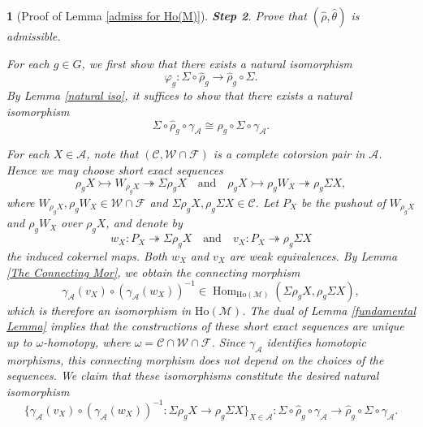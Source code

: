 \documentclass[12pt,twoside]{amsart}
\theoremstyle{bfupright head,slanted body}
\theoremstyle{bfupright head,upright body}
\newtheorem{bfhpg}[res]{}               \newtheorem*{bfhpg*}{}
\theoremstyle{fixed bf head,slanted body}
\theoremstyle{fixed bf head,upright body}
\theoremstyle{numbered paragraph}
\numberwithin{equation}{res}
\newcommand{\calC}{\mathcal{C}}
\newcommand{\calW}{\mathcal{W}}
\newcommand{\calF}{\mathcal{F}}
\newcommand{\calA}{\mathcal{A}}
\newcommand{\calM}{\mathcal{M}}
\newcommand{\Ho}{\mathrm{Ho}}
\newcommand{\Hom}{\operatorname{Hom}}
\begin{document}
\begin{bfhpg}[Proof of Lemma \ref{admiss for Ho(M)}]
\vspace{1ex}\textbf{Step 2}. Prove that $(\widehat{\rho}, \widehat{\theta})$ is admissible.

For each $g \in G$, we first show that there exists a natural isomorphism
\[
\varphi_g : \mathsf{\Sigma} \circ \widehat{\rho}_g \to \widehat{\rho}_g \circ \mathsf{\Sigma}.
\]
By Lemma \ref{natural iso}, it suffices to show that there exists a natural isomorphism
\[
\mathsf{\Sigma} \circ \widehat{\rho}_g \circ \gamma_{\calA} \cong \widehat{\rho}_g \circ \mathsf{\Sigma} \circ \gamma_{\calA}.
\]

For each $X \in \calA$, note that $(\calC, \calW \cap \calF)$ is a complete cotorsion pair in $\calA$.
Hence we may choose short exact sequences
\[
\rho_g X \rightarrowtail W_{\rho_g X} \twoheadrightarrow \mathsf{\Sigma} \rho_g X
\quad \text{and} \quad
\rho_g X \rightarrowtail \rho_g W_X \twoheadrightarrow \rho_g \mathsf{\Sigma} X,
\]
where $W_{\rho_g X}, \rho_g W_X \in \calW \cap \calF$ and $\mathsf{\Sigma} \rho_g X, \rho_g \mathsf{\Sigma} X \in \calC$.
Let $P_X$ be the pushout of $W_{\rho_g X}$ and $\rho_g W_X$ over $\rho_g X$, and denote by
\[
w_X : P_X \twoheadrightarrow \mathsf{\Sigma} \rho_g X
\quad \text{and} \quad
v_X : P_X \twoheadrightarrow \rho_g \mathsf{\Sigma} X
\]
the induced cokernel maps.
Both $w_X$ and $v_X$ are weak equivalences.
By Lemma \ref{The Connecting Mor}, we obtain the connecting morphism
\[
\gamma_{\calA}(v_X) \circ (\gamma_{\calA}(w_X))^{-1} \in \Hom_{\Ho(\calM)}(\mathsf{\Sigma} \rho_g X, \rho_g \mathsf{\Sigma} X),
\]
which is therefore an isomorphism in $\Ho(\calM)$.
The dual of Lemma \ref{fundamental Lemma} implies that the constructions of these short exact sequences are unique up to $\omega$-homotopy, where $\omega = \calC \cap \calW \cap \calF$.
Since $\gamma_{\calA}$ identifies homotopic morphisms, this connecting morphism does not depend on the choices of the sequences.
We claim that these isomorphisms constitute the desired natural isomorphism
\[
\{\gamma_{\calA}(v_X) \circ (\gamma_{\calA}(w_X))^{-1} : \mathsf{\Sigma} \rho_g X \to \rho_g \mathsf{\Sigma} X \}_{X \in \calA} :
\mathsf{\Sigma} \circ \widehat{\rho}_g \circ \gamma_{\calA} \to \widehat{\rho}_g \circ \mathsf{\Sigma} \circ \gamma_{\calA}.
\]


\end{bfhpg}
\end{document}
